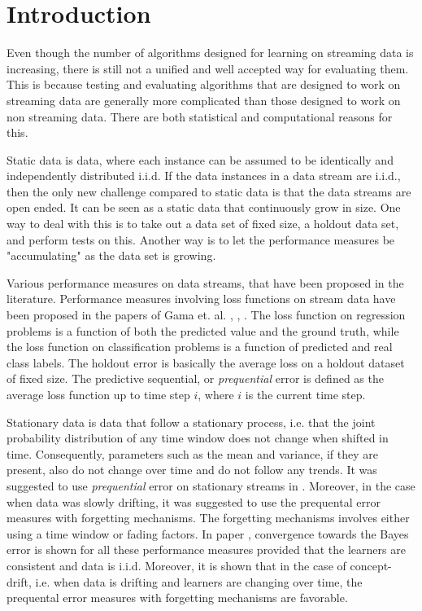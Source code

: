 \section{Introduction}

Even though the number of algorithms designed for learning on streaming data is increasing, there is still not a unified and well accepted way for evaluating them.  This is because testing and evaluating algorithms that are designed to work on streaming data are generally more complicated than those designed to work on non streaming data.  There are both statistical and computational reasons for this.  

Static data is data, where each instance can be assumed to be identically and independently distributed i.i.d. 
If the data instances in a data stream are i.i.d., then the only new challenge compared to static data is that the data streams are open ended.  It can be seen as a static data that continuously grow in size.  One way to deal with this is to take out a data set of fixed size, a holdout data set, and perform tests on this.  Another way is to let the performance measures be "accumulating" as the data set is growing.  

Various performance measures on data streams, that have been proposed in the literature.  Performance measures involving loss functions on stream data have been proposed in the papers of Gama et. al. \cite{Gam09}, \cite{Gam09_2}, \cite{Gam13}.  The loss function on regression problems is a function of both the predicted value and the ground truth, while the loss function on classification problems is a function of predicted and real class labels.  The holdout error is basically the average loss on a holdout dataset of fixed size.  The predictive sequential, or \emph{prequential} error is defined as the average loss function up to time step $i$, where $i$ is the current time step. 

Stationary data is data that follow a stationary process, i.e. that the joint probability distribution of any time window does not change when shifted in time. Consequently, parameters such as the mean and variance, if they are present, also do not change over time and do not follow any trends.  It was suggested to use  \emph{prequential} error on stationary streams in \cite{Gam13}.  Moreover, in the case when data was slowly drifting, it was suggested to use the prequental error measures with forgetting mechanisms. The forgetting mechanisms involves either using a time window or fading factors.  In paper \cite{Gam13}, convergence towards the Bayes error is shown for all these performance measures provided that the learners are consistent and data is i.i.d.  Moreover, it is shown that in the case of concept-drift, i.e. when data is drifting and learners are changing over time, the prequental error measures with forgetting mechanisms are favorable.

